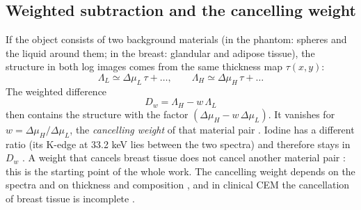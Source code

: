 \documentclass[11pt,a4paper]{article}
\newcommand{\LL}{\Lambda_L}
\newcommand{\LH}{\Lambda_H}
\begin{document}
\subsection{Weighted subtraction and the cancelling weight}
If the object consists of two background materials (in the phantom: spheres and the liquid around them; in the
breast: glandular and adipose tissue), the structure in both log images comes from the same thickness map
$\tau(x,y)$:
\begin{equation}
\LL \simeq \Delta\mu_L\,\tau + \ldots,\qquad \LH \simeq \Delta\mu_H\,\tau + \ldots
\end{equation}
The weighted difference
\begin{equation}
D_w = \LH - w\,\LL
\label{eq:Dw}
\end{equation}
then contains the structure with the factor $(\Delta\mu_H - w\,\Delta\mu_L)$. It vanishes for
$w=\Delta\mu_H/\Delta\mu_L$, the \emph{cancelling weight} of that material pair \cite{alvarez1976,lehmann1981,johns1985}.
Iodine has a different ratio (its K-edge at 33.2 keV lies between the two spectra) and therefore stays in $D_w$
\cite{lewin2003,korporaal2018}. A weight that cancels breast tissue does not cancel another material pair
\cite{lehmann1981,johns1987}: this is the starting point of the whole work. The cancelling weight depends on the
spectra and on thickness and composition \cite{carton2010,hu2017}, and in clinical CEM the cancellation of breast
tissue is incomplete \cite{hill2013b}.
\end{document}
